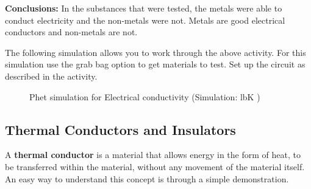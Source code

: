     \par
  \par 
      \label{m38706*id66494}\noindent{}\textbf{Conclusions:}
        \newline
  In the substances that were tested, the metals were able to conduct electricity and the non-metals were not. Metals are good electrical conductors and non-metals are not.\par 
\label{m38706*eip-316}The following simulation allows you to work through the above activity. For this simulation use the grab bag option to get materials to test. Set up the circuit as described in the activity.
    \setcounter{subfigure}{0}
	\begin{figure}[H] %
    \textnormal{Phet simulation for Electrical conductivity}\vspace{.1in} \nopagebreak
  \label{m38806*phet!!!underscore!!!sim}\label{m38806*phet-simulation}
             { (Simulation:  lbK )}
      \vspace{2pt}
    \vspace{.1in}
 \end{figure}    
        \par 
    \label{m38706*cid7}
            \subsection{ Thermal Conductors and Insulators}
            \nopagebreak
      \label{m38706*id66527}A \textbf{thermal conductor} is a material that allows energy in the form of heat, to be transferred within the material, without any movement of the material itself. An easy way to understand this concept is through a simple demonstration.\par 
\label{m38706*secfhsst!!!underscore!!!id453}
